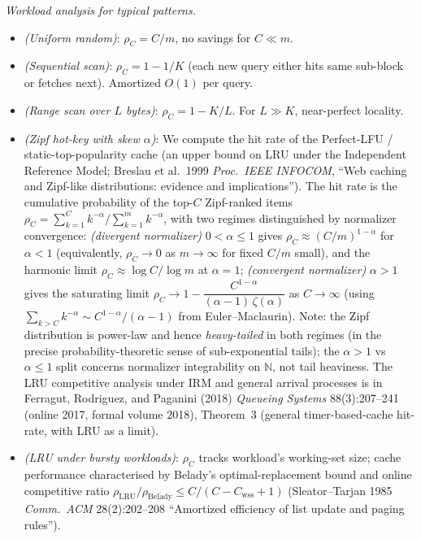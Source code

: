 \documentclass[
]{article}
\begin{document}
\emph{Workload analysis for typical patterns.}
\begin{itemize}
\item \emph{(Uniform random)}: $\rho_C = C/m$, no savings for $C \ll m$.
\item \emph{(Sequential scan)}: $\rho_C = 1 - 1/K$ (each new query
either hits same sub-block or fetches next). Amortized $O(1)$ per
query.
\item \emph{(Range scan over $L$ bytes)}: $\rho_C = 1 - K/L$. For
$L \gg K$, near-perfect locality.
\item \emph{(Zipf hot-key with skew $\alpha$)}: We compute the hit rate
of the Perfect-LFU / static-top-popularity cache (an upper bound on
LRU under the Independent Reference Model; Breslau et al.\ 1999
\emph{Proc.\ IEEE INFOCOM}, ``Web caching and Zipf-like distributions:
evidence and implications'').
The hit rate is the cumulative probability of the top-$C$ Zipf-ranked
items $\rho_C = \sum_{k=1}^C k^{-\alpha} / \sum_{k=1}^m k^{-\alpha}$,
with two regimes distinguished by normalizer convergence:
\emph{(divergent normalizer)} $0 < \alpha \leq 1$ gives
$\rho_C \approx (C/m)^{1-\alpha}$ for $\alpha < 1$
(equivalently, $\rho_C \to 0$ as $m \to \infty$ for fixed $C/m$ small),
and the harmonic limit $\rho_C \approx \log C / \log m$ at $\alpha = 1$;
\emph{(convergent normalizer)} $\alpha > 1$ gives the saturating
limit
$\rho_C \to 1 - \dfrac{C^{1-\alpha}}{(\alpha-1)\,\zeta(\alpha)}$
as $C \to \infty$ (using $\sum_{k>C} k^{-\alpha} \sim
C^{1-\alpha}/(\alpha-1)$ from Euler--Maclaurin).
Note: the Zipf distribution is power-law and hence \emph{heavy-tailed}
in both regimes (in the precise probability-theoretic sense of
sub-exponential tails); the $\alpha > 1$ vs $\alpha \leq 1$ split
concerns normalizer integrability on $\mathbb{N}$, not tail
heaviness. The LRU competitive analysis under IRM and general
arrival processes is in Ferragut, Rodriguez, and Paganini (2018)
\emph{Queueing Systems} 88(3):207--241 (online 2017, formal volume
2018), Theorem~3 (general timer-based-cache hit-rate, with LRU as
a limit).
\item \emph{(LRU under bursty workloads)}: $\rho_C$ tracks workload's
working-set size; cache performance characterised by Belady's
optimal-replacement bound and online competitive ratio
$\rho_{\mathrm{LRU}}/\rho_{\mathrm{Bel\acute{a}dy}} \leq C/(C - C_{\mathrm{wss}} + 1)$
(Sleator--Tarjan 1985 \emph{Comm.\ ACM} 28(2):202--208 ``Amortized
efficiency of list update and paging rules'').
\end{itemize}
\end{document}
